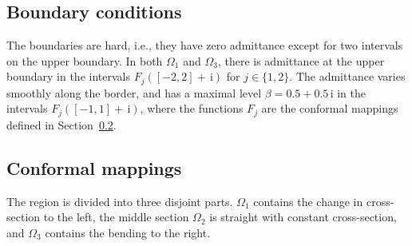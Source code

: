\documentclass[numreferences]{kluwer}
\renewcommand{\i}{\,\mathrm{i}}
\begin{document}
\subsection{Boundary conditions}
\label{sec:boundary-conditions}


The boundaries are hard, i.e., they have zero admittance except for
two intervals on the upper boundary. In both $\Omega_1$ and
$\Omega_3$, there is admittance at the upper boundary in the intervals
$F_j([-2,2]+\i)$ for $j\in\{1,2\}$. The admittance varies smoothly
along the border, and has a maximal level $\beta=0.5+0.5\i$ in the
intervals $F_j([-1,1]+\i)$, where the functions $F_j$ are the
conformal mappings defined in Section~\ref{sec:conformal-mappings}.

\subsection{Conformal mappings}
\label{sec:conformal-mappings}

The region is divided into three disjoint parts. $\Omega_1$ contains
the change in cross-section to the left, the middle section $\Omega_2$
is straight with constant cross-section, and $\Omega_3$ contains the
bending to the right.
\end{document}
